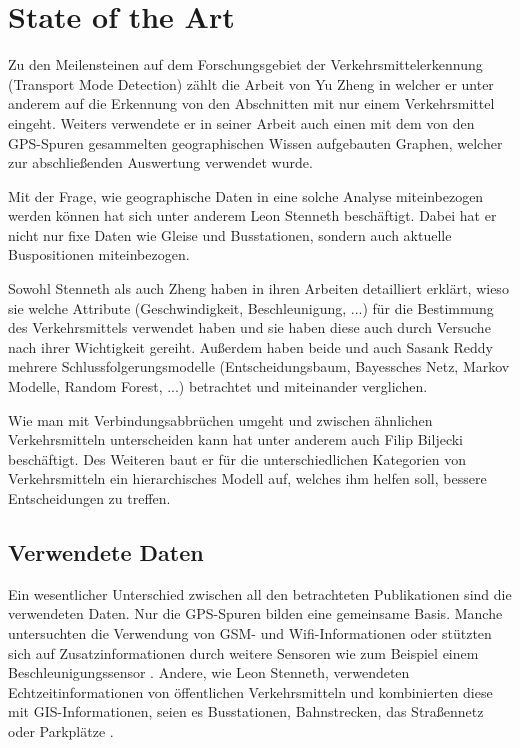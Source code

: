 \chapter{State of the Art}
Zu den Meilensteinen auf dem Forschungsgebiet der Verkehrsmittelerkennung (Transport Mode Detection) zählt die Arbeit von Yu Zheng in welcher er unter anderem auf die Erkennung von den Abschnitten mit nur einem Verkehrsmittel eingeht. Weiters verwendete er in seiner Arbeit auch einen mit dem von den GPS-Spuren gesammelten geographischen Wissen aufgebauten Graphen, welcher zur abschließenden Auswertung verwendet wurde.\cite{zheng_understanding_2010} \cite{zheng_understanding_2008} \cite{zheng_learning_2008}

Mit der Frage, wie geographische Daten in eine solche Analyse miteinbezogen werden können hat sich unter anderem Leon Stenneth beschäftigt. Dabei hat er nicht nur fixe Daten wie Gleise und Busstationen, sondern auch aktuelle Buspositionen miteinbezogen. \cite{stenneth_transportation_2011}

Sowohl Stenneth als auch Zheng haben in ihren Arbeiten detailliert erklärt, wieso sie welche Attribute (Geschwindigkeit, Beschleunigung, ...) für die Bestimmung des Verkehrsmittels verwendet haben und sie haben diese auch durch Versuche nach ihrer Wichtigkeit gereiht. Außerdem haben beide und auch Sasank Reddy \cite{reddy_determining_2008} mehrere Schlussfolgerungsmodelle (Entscheidungsbaum, Bayessches Netz, Markov Modelle, Random Forest, ...) betrachtet und miteinander verglichen. 

Wie man mit Verbindungsabbrüchen umgeht und zwischen ähnlichen Verkehrsmitteln unterscheiden kann hat unter anderem auch Filip Biljecki beschäftigt. Des Weiteren baut er für die unterschiedlichen Kategorien von Verkehrsmitteln ein hierarchisches Modell auf, welches ihm helfen soll, bessere Entscheidungen zu treffen. \cite{biljecki_transportation_2013}

\section{Verwendete Daten}
Ein wesentlicher Unterschied zwischen all den betrachteten Publikationen sind die verwendeten Daten. Nur die GPS-Spuren bilden eine gemeinsame Basis. Manche untersuchten die Verwendung von GSM- und Wifi-Informationen \cite{reddy_using_2010} oder stützten sich auf Zusatzinformationen durch weitere Sensoren wie zum Beispiel einem Beschleunigungssensor \cite{reddy_using_2010}  \cite{nadine_schussler_improving_2011}. Andere, wie Leon Stenneth, verwendeten Echtzeitinformationen von öffentlichen Verkehrsmitteln und kombinierten diese mit GIS-Informationen, seien es Busstationen, Bahnstrecken, das Straßennetz oder Parkplätze \cite{stenneth_transportation_2011}.


